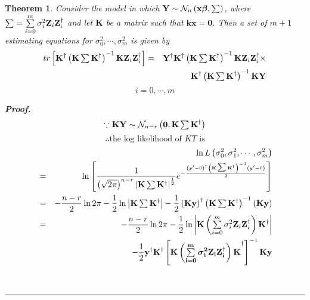 \documentclass{article}
\newtheorem{theorem}{Theorem}
\newenvironment{proof}[1][Proof]{\noindent\textbf{#1.} }{\ \rule{0.5em}{0.5em}}
\begin{document}
\begin{theorem}
Consider the model in which $\mathbf{Y}\sim \mathcal{N}_{n}\left( \mathbf{%
x\beta },\tsum \right) $, where $\tsum =\tsum\limits_{i=0}^{m}\sigma _{i}^{2}%
\mathbf{Z}_{i}\mathbf{Z}_{i}^{\dagger }$ and let $\mathbf{K}$ be a matrix
such that $\mathbf{kx}=\mathbf{0}$. Then a set of $m+1$ estimating equations
for $\sigma _{0}^{2},\cdots ,\sigma _{m}^{2}$ is given by%
\begin{eqnarray*}
tr\left[ \mathbf{K}^{\dagger }\left( \mathbf{K}\tsum \mathbf{K}^{\dagger
}\right) ^{-1}\mathbf{KZ}_{i}\mathbf{Z}_{i}^{\dagger }\right] &=&\mathbf{Y}%
^{\dagger }\mathbf{K}^{\dagger }\left( \mathbf{K}\tsum \mathbf{K}^{\dagger
}\right) ^{-1}\mathbf{KZ}_{i}\mathbf{Z}_{i}^{\dagger }\times \\
&&\mathbf{K}^{\dagger }\left( \mathbf{K}\tsum \mathbf{K}^{\dagger }\right)
^{-1}\mathbf{KY}
\end{eqnarray*}%
\begin{equation*}
i=0,\cdots ,m
\end{equation*}

\begin{proof}
\begin{equation*}
\because \mathbf{KY}\sim \mathcal{N}_{n-r}\left( \mathbf{0},\mathbf{K}\mathop{\textstyle \sum } 
\mathbf{K}^{\dagger }\right)
\end{equation*}%
\begin{equation*}
\therefore \text{the log likelihood of }KT\text{ is}
\end{equation*}%
\begin{eqnarray*}
&&\ln L\left( \sigma _{0}^{2},\sigma _{1}^{2},\cdots ,\sigma _{m}^{2}\right)
\\
&=&\ln \left[ \frac{1}{\left( \sqrt{2\pi }\right) ^{n-r}\left\vert \mathbf{K}%
\tsum \mathbf{K}^{\dagger }\right\vert ^{\frac{1}{2}}}{\LARGE e}^{-\frac{%
\left( \mathbf{y}^{\prime }-0\right) ^{\dagger }\left( \mathbf{K}\tsum 
\mathbf{K}^{\dagger }\right) ^{-1}\left( \mathbf{y}^{\prime }-0\right) }{2}}%
\right] \\
&=&-\frac{n-r}{2}\ln 2\pi -\frac{1}{2}\ln \left\vert \mathbf{K}\tsum \mathbf{%
K}^{\dagger }\right\vert -\frac{1}{2}\left( \mathbf{Ky}\right) ^{\dagger
}\left( \mathbf{K}\tsum \mathbf{K}^{\dagger }\right) ^{-1}\left( \mathbf{Ky}%
\right) \\
&=&-\frac{n-r}{2}\ln 2\pi -\frac{1}{2}\ln \left\vert \mathbf{K}\left(
\tsum\limits_{i=0}^{m}\sigma _{i}^{2}\mathbf{Z}_{i}\mathbf{Z}_{i}^{\dagger
}\right) \mathbf{K}^{\dagger }\right\vert \\
&&-\frac{1}{2}\mathbf{y}^{\dagger }\mathbf{K}^{\dagger }\left[ \mathbf{%
K\left( \tsum\limits_{i=0}^{m}\sigma _{i}^{2}\mathbf{Z}_{i}\mathbf{Z}%
_{i}^{\dagger }\right) K}^{\dagger }\right] ^{-1}\mathbf{Ky}
\end{eqnarray*}


\end{proof}
\end{theorem}
\end{document}
